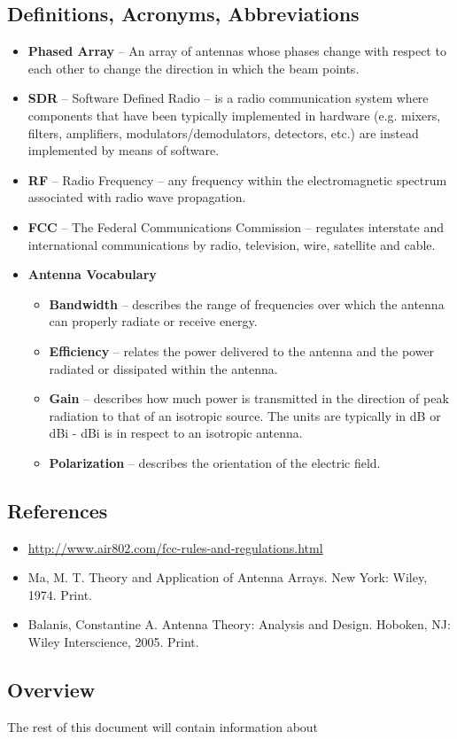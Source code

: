 \documentclass[ProjectRequirements.tex]{subfiles}
\begin{document}
	\subsection{Definitions, Acronyms, Abbreviations}
		\begin{itemize}
			\item \textbf{Phased Array} -- An array of antennas whose phases change with respect to each other to change the direction in which the beam points.
			\item \textbf{SDR} -- Software Defined Radio -- is a radio communication system where components that have been typically implemented in hardware (e.g. mixers, filters, amplifiers, modulators/demodulators, detectors, etc.) are instead implemented by means of software. 
			\item \textbf{RF} -- Radio Frequency --  any frequency within the electromagnetic spectrum associated with radio wave propagation. 
			\item \textbf{FCC} -- The Federal Communications Commission -- regulates interstate and international communications by radio, television, wire, satellite and cable.
			\item \textbf{Antenna Vocabulary}
			\begin{itemize}
				\item \textbf{Bandwidth} -- describes the range of frequencies over which the antenna can properly radiate or receive energy.
				\item \textbf{Efficiency} -- relates the power delivered to the antenna and the power radiated or dissipated within the antenna.
				\item \textbf{Gain} -- describes how much power is transmitted in the direction of peak radiation to that of an isotropic source. The units are typically in dB or dBi - dBi is in respect to an isotropic antenna. 
				\item \textbf{Polarization} -- describes the orientation of the electric field.
			\end{itemize}
		\end{itemize}
	\subsection{References}
		\begin{itemize}
			\item \url{http://www.air802.com/fcc-rules-and-regulations.html}
			\item Ma, M. T. Theory and Application of Antenna Arrays. New York: Wiley, 1974. Print.
			\item Balanis, Constantine A. Antenna Theory: Analysis and Design. Hoboken, NJ: Wiley Interscience, 2005. Print.
		\end{itemize}
	\subsection{Overview}
		The rest of this document will contain information about 
\end{document}
